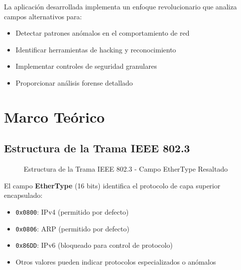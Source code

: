 \documentclass[12pt,a4paper]{article}
\begin{document}
La aplicación desarrollada implementa un enfoque revolucionario que analiza campos alternativos para:
\begin{itemize}
    \item Detectar patrones anómalos en el comportamiento de red
    \item Identificar herramientas de hacking y reconocimiento
    \item Implementar controles de seguridad granulares
    \item Proporcionar análisis forense detallado
\end{itemize}

\section{Marco Teórico}

\subsection{Estructura de la Trama IEEE 802.3}

\begin{figure}[H]
\centering
{}
\caption{Estructura de la Trama IEEE 802.3 - Campo EtherType Resaltado}
\end{figure}

El campo \textbf{EtherType} (16 bits) identifica el protocolo de capa superior encapsulado:
\begin{itemize}
    \item \texttt{0x0800}: IPv4 (permitido por defecto)
    \item \texttt{0x0806}: ARP (permitido por defecto)
    \item \texttt{0x86DD}: IPv6 (bloqueado para control de protocolo)
    \item Otros valores pueden indicar protocolos especializados o anómalos
\end{itemize}
\end{document}
